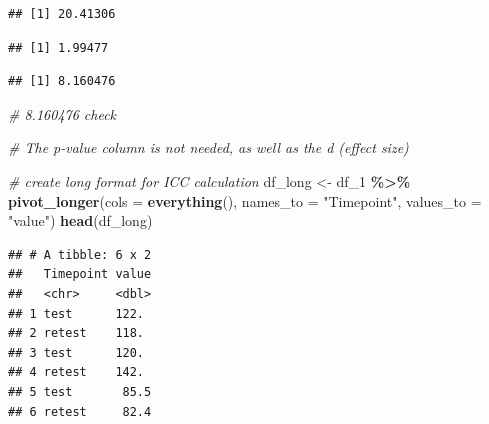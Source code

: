 \documentclass[
]{book}
\newenvironment{Shaded}{\begin{snugshade}}{\end{snugshade}}
\newcommand{\AttributeTok}[1]{\textcolor[rgb]{0.13,0.29,0.53}{#1}}
\newcommand{\CommentTok}[1]{\textcolor[rgb]{0.56,0.35,0.01}{\textit{#1}}}
\newcommand{\ConstantTok}[1]{\textcolor[rgb]{0.56,0.35,0.01}{#1}}
\newcommand{\FunctionTok}[1]{\textcolor[rgb]{0.13,0.29,0.53}{\textbf{#1}}}
\newcommand{\NormalTok}[1]{#1}
\newcommand{\OtherTok}[1]{\textcolor[rgb]{0.56,0.35,0.01}{#1}}
\newcommand{\SpecialCharTok}[1]{\textcolor[rgb]{0.81,0.36,0.00}{\textbf{#1}}}
\newcommand{\StringTok}[1]{\textcolor[rgb]{0.31,0.60,0.02}{#1}}
\begin{document}
\begin{verbatim}
## [1] 20.41306
\end{verbatim}

\begin{Shaded}
\end{Shaded}

\begin{verbatim}
## [1] 1.99477
\end{verbatim}

\begin{Shaded}
\end{Shaded}

\begin{verbatim}
## [1] 8.160476
\end{verbatim}

\begin{Shaded}
\begin{Highlighting}[]
\CommentTok{\# 8.160476 check}

\CommentTok{\# The p{-}value column is not needed, as well as the d (effect size)}

\CommentTok{\# create long format for ICC calculation}
\NormalTok{df\_long }\OtherTok{\textless{}{-}}\NormalTok{ df\_1 }\SpecialCharTok{\%\textgreater{}\%}
  \FunctionTok{pivot\_longer}\NormalTok{(}\AttributeTok{cols =} \FunctionTok{everything}\NormalTok{(), }\AttributeTok{names\_to =} \StringTok{"Timepoint"}\NormalTok{, }\AttributeTok{values\_to =} \StringTok{"value"}\NormalTok{) }
\FunctionTok{head}\NormalTok{(df\_long)}
\end{Highlighting}
\end{Shaded}

\begin{verbatim}
## # A tibble: 6 x 2
##   Timepoint value
##   <chr>     <dbl>
## 1 test      122. 
## 2 retest    118. 
## 3 test      120. 
## 4 retest    142. 
## 5 test       85.5
## 6 retest     82.4
\end{verbatim}
\end{document}
